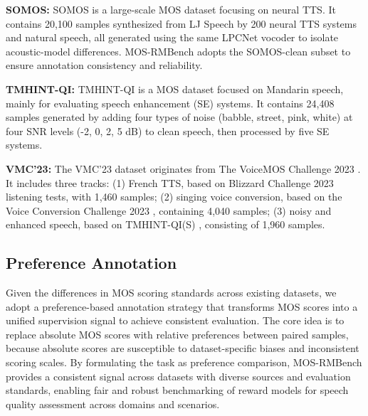 \textbf{SOMOS:} SOMOS is a large-scale MOS dataset focusing on neural TTS. It contains 20,100 samples synthesized from LJ Speech \citep{ito2017lj} by 200 neural TTS systems and natural speech, all generated using the same LPCNet vocoder \citep{valin2019lpcnet} to isolate acoustic-model differences. MOS-RMBench adopts the SOMOS-clean subset to ensure annotation consistency and reliability.

\textbf{TMHINT-QI:} TMHINT-QI is a MOS dataset focused on Mandarin speech, mainly for evaluating speech enhancement (SE) systems. It contains 24,408 samples generated by adding four types of noise (babble, street, pink, white) at four SNR levels (-2, 0, 2, 5 dB) to clean speech, then processed by five SE systems.

\textbf{VMC'23:} The VMC'23 dataset originates from The VoiceMOS Challenge 2023 \citep{vmc23}. It includes three tracks: (1) French TTS, based on Blizzard Challenge 2023 \citep{perrotin2023blizzard} listening tests, with 1,460 samples; (2) singing voice conversion, based on the Voice Conversion Challenge 2023 \citep{huang2023singing}, containing 4,040 samples; (3) noisy and enhanced speech, based on TMHINT-QI(S) \citep{zezario2024study}, consisting of 1,960 samples.

\subsection{Preference Annotation}
Given the differences in MOS scoring standards across existing datasets, we adopt a preference-based annotation strategy that transforms MOS scores into a unified supervision signal to achieve consistent evaluation. The core idea is to replace absolute MOS scores with relative preferences between paired samples, because absolute scores are susceptible to dataset-specific biases and inconsistent scoring scales. By formulating the task as preference comparison, MOS-RMBench provides a consistent signal across datasets with diverse sources and evaluation standards, enabling fair and robust benchmarking of reward models for speech quality assessment across domains and scenarios.

